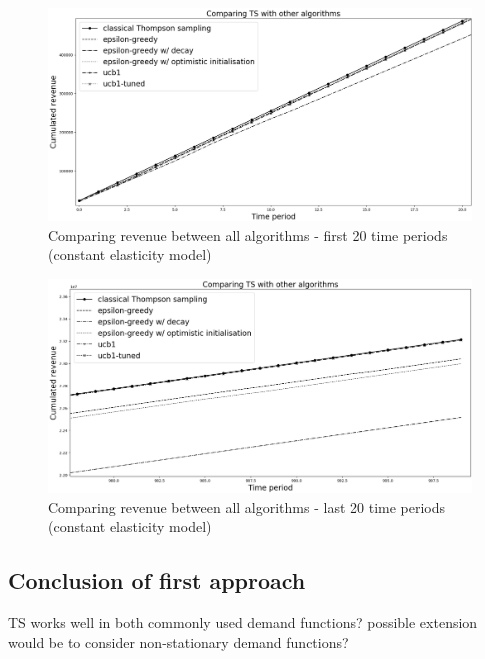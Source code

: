 \documentclass[a4paper]{article}
\begin{document}
\begin{figure}[h!]
	\centering
	\includegraphics[width=1.03\textwidth]{5.png}
	\caption{\label{fig:5}Comparing revenue between all algorithms - first 20 time periods (constant elasticity model)}
\end{figure}
\begin{figure}[h!]
	\centering
	\includegraphics[width=1.03\textwidth]{6.png}
	\caption{\label{fig:6}Comparing revenue between all algorithms - last 20 time periods (constant elasticity model)}
\end{figure}
\subsection{Conclusion of first approach}
TS works well in both commonly used demand functions? possible extension would be to consider non-stationary demand functions?
\pagebreak
\end{document}

